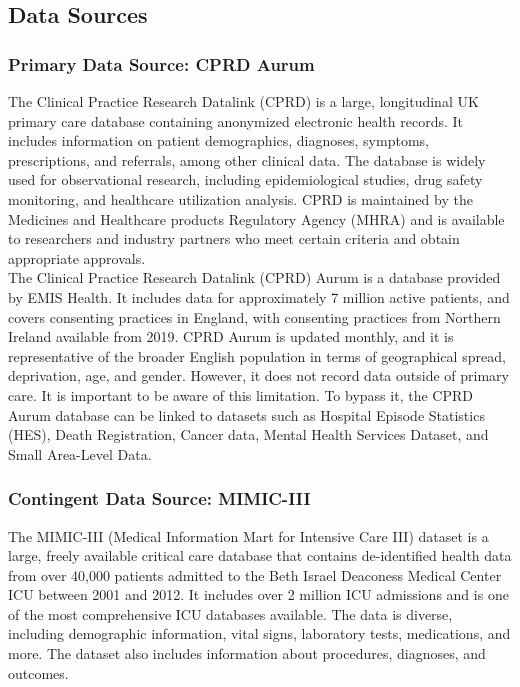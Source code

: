 \documentclass[%
 reprint,
 amsmath,amssymb,
 aps,
 nofootinbib
]{revtex4-2}
\theoremstyle{definition}
\begin{document}
\subsection{\label{data}Data Sources}

\subsubsection{\label{cprd} Primary Data Source: CPRD Aurum}
The Clinical Practice Research Datalink (CPRD) is a large, longitudinal UK primary care database containing anonymized electronic health records. It includes information on patient demographics, diagnoses, symptoms, prescriptions, and referrals, among other clinical data. The database is widely used for observational research, including epidemiological studies, drug safety monitoring, and healthcare utilization analysis. CPRD is maintained by the Medicines and Healthcare products Regulatory Agency (MHRA) and is available to researchers and industry partners who meet certain criteria and obtain appropriate approvals.\\

The Clinical Practice Research Datalink (CPRD) Aurum is a database provided by EMIS Health. It includes data for approximately 7 million active patients, and covers consenting practices in England, with consenting practices from Northern Ireland available from 2019. CPRD Aurum is updated monthly, and it is representative of the broader English population in terms of geographical spread, deprivation, age, and gender. However, it does not record data outside of primary care. It is important to be aware of this limitation. To bypass it, the CPRD Aurum database can be linked to datasets such as Hospital Episode Statistics (HES), Death Registration, Cancer data, Mental Health Services Dataset, and Small Area-Level Data.

\subsubsection{\label{mimiciii} Contingent Data Source: MIMIC-III}

The MIMIC-III (Medical Information Mart for Intensive Care III) dataset is a large, freely available critical care database that contains de-identified health data from over 40,000 patients admitted to the Beth Israel Deaconess Medical Center ICU between 2001 and 2012. It includes over 2 million ICU admissions and is one of the most comprehensive ICU databases available. The data is diverse, including demographic information, vital signs, laboratory tests, medications, and more. The dataset also includes information about procedures, diagnoses, and outcomes.\\
\end{document}
